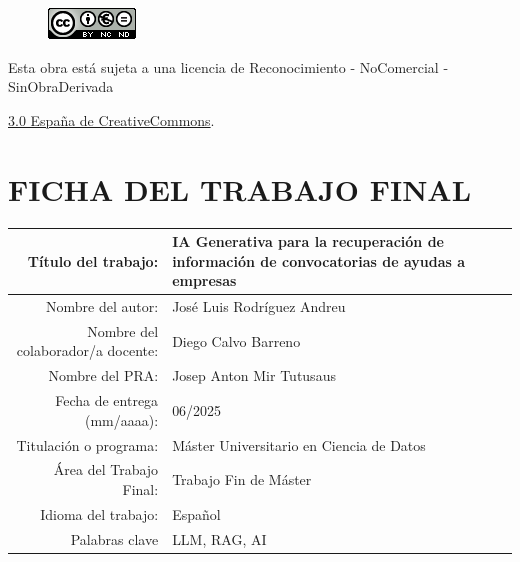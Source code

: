 \setcounter{page}{1} 
\pagestyle{plain}




\vspace{1cm}

\begin{figure}[ht]
    \centering
	\includegraphics[scale=1]{images/license.png}
\end{figure}

Esta obra está sujeta a una licencia de Reconocimiento -  NoComercial - SinObraDerivada

\href{https://creativecommons.org/licenses/by-nc-nd/3.0/es/}{3.0 España de CreativeCommons}.

\chapter*{FICHA DEL TRABAJO FINAL}

\begin{table}[ht]
	\centering{}
	\renewcommand{\arraystretch}{2}
	\begin{tabular}{r | p{10cm}}
		\hline
		Título del trabajo: & IA Generativa para la recuperación 
		de información de convocatorias de ayudas a empresas\\
		\hline
        Nombre del autor: & José Luis Rodríguez Andreu\\
		\hline
        Nombre del colaborador/a docente: & Diego Calvo Barreno\\
		\hline
        Nombre del PRA: & Josep Anton Mir Tutusaus\\
		\hline
        Fecha de entrega (mm/aaaa): & 06/2025\\
		\hline
        Titulación o programa: & Máster Universitario en Ciencia de Datos\\
		\hline
        Área del Trabajo Final: & Trabajo Fin de Máster\\
		\hline
        Idioma del trabajo: & Español\\
		\hline
        Palabras clave & LLM, RAG, AI\\
		\hline
	\end{tabular}
\end{table}

